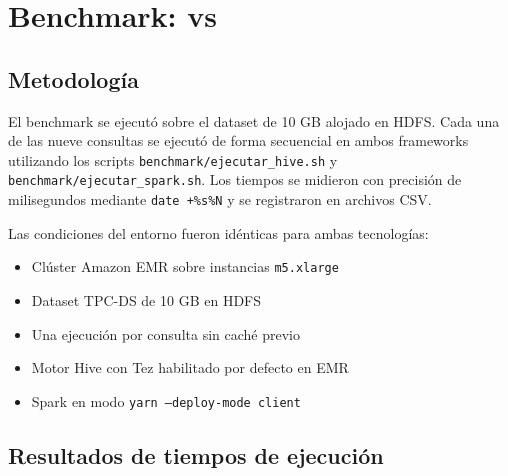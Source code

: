 
\section{Benchmark: \hive{} vs \spark{}}

\subsection{Metodología}

El benchmark se ejecutó sobre el dataset \tpcds{} de 10 GB alojado en HDFS.
Cada una de las nueve consultas se ejecutó de forma secuencial en ambos frameworks
utilizando los scripts \texttt{benchmark/ejecutar\_hive.sh} y
\texttt{benchmark/ejecutar\_spark.sh}. Los tiempos se midieron con precisión de
milisegundos mediante \texttt{date +\%s\%N} y se registraron en archivos CSV.

Las condiciones del entorno fueron idénticas para ambas tecnologías:

\begin{itemize}[noitemsep]
    \item Clúster Amazon EMR sobre instancias \texttt{m5.xlarge}
    \item Dataset TPC-DS de 10 GB en HDFS
    \item Una ejecución por consulta sin caché previo
    \item Motor Hive con Tez habilitado por defecto en EMR
    \item Spark en modo \texttt{yarn --deploy-mode client}
\end{itemize}

\subsection{Resultados de tiempos de ejecución}

